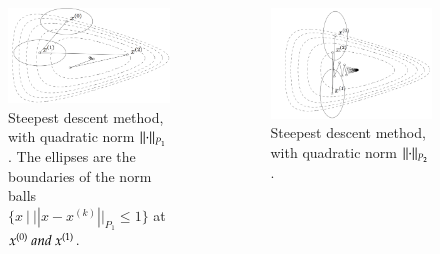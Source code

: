 \begin{frame}
{\begin{columns}
  \begin{column}{0.5\textwidth}
    \begin{figure}[t]
      \includegraphics[scale=0.15]{pics/911.png}
      \caption{\tiny Steepest descent method, with quadratic norm
        $\left\lVert\cdot\right\rVert_{P_1}$. The ellipses are the boundaries of the
        norm balls $\{x ~ |~ ||x - x^{(k)}||_{P_1} \le 1\}$ at $x^{(0)}
        ~and~ x^{(1)}$.}
    \end{figure}
  \end{column}


  \begin{column}{0.5\textwidth}
    \begin{figure}[t]
      \includegraphics[scale=0.12]{pics/912.png}
      \caption{\tiny Steepest descent method, with quadratic norm
        $\left\lVert\cdot\right\rVert_{P_2}$.}
    \end{figure}
  \end{column}
\end{columns}
}


\end{frame}

